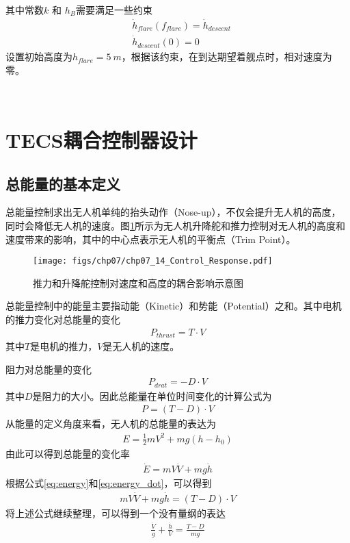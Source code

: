 其中常数$k$ 和 $h_B$需要满足一些约束
\begin{align}
&\dot{h}_{flare} (f_{flare}) = \dot{h}_{descent} \\
&\dot{h}_{descent}(0)  = 0
\end{align}
设置初始高度为$h_{flare} = 5\ m$，根据该约束，在到达期望着舰点时，相对速度为零。

​\section{TECS耦合控制器设计}
\subsection{总能量的基本定义}
总能量控制求出无人机单纯的抬头动作（Nose-up），不仅会提升无人机的高度，同时会降低无人机的速度。图\ref{fig:chp07_14_Control_Response}所示为无人机升降舵和推力控制对无人机的高度和速度带来的影响，其中的中心点表示无人机的平衡点（Trim Point）。

\begin{figure}[ht]   
	\centering
	\texttt{[image: figs/chp07/chp07\_14\_Control\_Response.pdf]}
	\caption{推力和升降舵控制对速度和高度的耦合影响示意图}
	\label{fig:chp07_14_Control_Response}
\end{figure}

总能量控制中的能量主要指动能（Kinetic）和势能（Potential）之和。其中电机的推力变化对总能量的变化
\begin{align}
P_{thrust} = T \cdot V
\end{align}
其中$T$是电机的推力，$V$是无人机的速度。

阻力对总能量的变化
\begin{align}
P_{drat} = -D \cdot V
\end{align}
其中$D$是阻力的大小。因此总能量在单位时间变化的计算公式为
\begin{align}
P=(T-D)\cdot V
\end{align}
从能量的定义角度来看，无人机的总能量的表达为
\begin{align}
\label{eq:energy}
E = \frac{1}{2} mV^2 + mg(h - h_0)
\end{align}
由此可以得到总能量的变化率
\begin{align}
\label{eq:energy_dot}
\dot{E} = mV\dot{V} + mg\dot{h}
\end{align}
根据公式\ref{eq:energy}和\ref{eq:energy_dot}，可以得到
\begin{align}
mV\dot{V} + mg\dot{h} =(T-D)\cdot V
\end{align}
将上述公式继续整理，可以得到一个没有量纲的表达
\begin{align}
\label{eq:energy_3}
\frac{\dot{V}}{g} + \frac{\dot{h}}{V}  =\frac{T-D}{mg}
\end{align}

